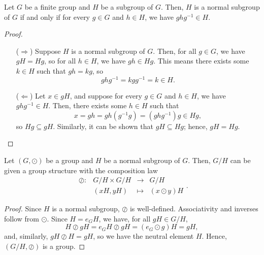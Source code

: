 \begin{prop}
Let $ G $ be a finite group and $ H $ be a subgroup of $ G $. Then, $ H $ is a normal subgroup of $ G $ if and only if for every $ g\in G $ and $ h\in H $, we have $ ghg^{-1}\in H $.
\end{prop}
\begin{proof}~
\begin{enumerate}

\item[($ \Rightarrow $)] Suppose $ H $ is a normal subgroup of $ G $. Then, for all $ g\in G $, we have $ gH=Hg $, so for all $ h\in H $, we have $ gh\in Hg $. This means there exists some $ k\in H $ such that $ gh=kg $, so
\begin{equation*}
    ghg^{-1}=kgg^{-1}=k\in H.
\end{equation*}

\item[($ \Leftarrow $)] Let $ x\in gH $, and suppose for every $ g\in G $ and $ h\in H $, we have $ ghg^{-1}\in H $. Then, there exists some $ h\in H $ such that
\begin{equation*}
    x=gh=gh(g^{-1}g)=(ghg^{-1})g\in Hg,
\end{equation*}
so $ Hg\subseteq gH $. Similarly, it can be shown that $ gH\subseteq Hg $; hence, $ gH=Hg $. \qedhere

\end{enumerate}
\end{proof}

\begin{thm}
Let $ (G,\odot) $ be a group and $ H $ be a normal subgroup of $ G $. Then, $ G/H $ can be given a group structure with the composition law
\begin{equation*}
    \begin{array}{rccc}
        \oslash: & G/H\times G/H & \to & G/H \\
        & (xH,yH) & \mapsto & (x\odot y)H
    \end{array}.
\end{equation*}
\end{thm}
\begin{proof}
Since $ H $  is a normal subgroup, $ \oslash $ is well-defined. Associativity and inverses follow from $ \odot $. Since $ H=e_GH $, we have, for all $ gH\in G/H $,
\begin{equation*}
    H\oslash gH=e_GH\oslash gH=(e_G\odot g)H=gH,
\end{equation*}
and, similarly, $ gH\oslash H=gH $, so we have the neutral element $ H $. Hence, $ (G/H,\oslash) $ is a group.
\end{proof}

